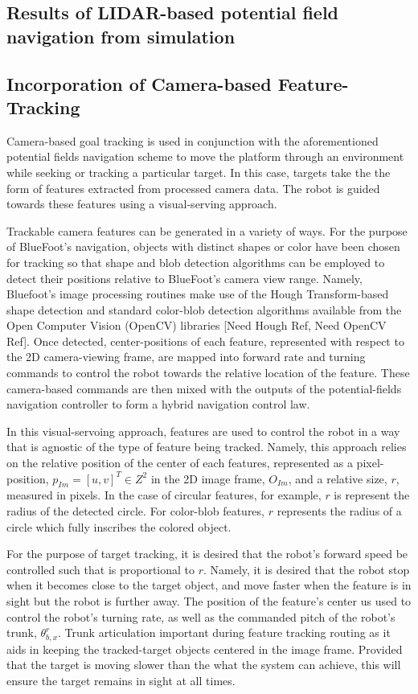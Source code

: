 		\subsection{Results of LIDAR-based potential field navigation from simulation}


		\subsection{Incorporation of Camera-based Feature-Tracking}
		
			Camera-based goal tracking is used in conjunction with the aforementioned potential fields navigation scheme to move the platform through an environment while seeking or tracking a particular target. In this case, targets take the the form of features extracted from processed camera data. The robot is guided towards these features using a visual-serving approach. 

			Trackable camera features can be generated in a variety of ways. For the purpose of BlueFoot's navigation, objects with distinct shapes or color have been chosen for tracking so that shape and blob detection algorithms can be employed to detect their positions relative to BlueFoot's camera view range. Namely, Bluefoot's image processing routines make use of the Hough Transform-based shape detection and standard color-blob detection algorithms available from the Open Computer Vision (OpenCV) libraries [Need Hough Ref, Need OpenCV Ref]. Once detected, center-positions of each feature, represented with respect to the 2D camera-viewing frame, are mapped into forward rate and turning commands to control the robot towards the relative location of the feature. These camera-based commands are then mixed with the outputs of the potential-fields navigation controller to form a hybrid navigation control law.

			In this visual-servoing approach, features are used to control the robot in a way that is agnostic of the type of feature being tracked. Namely, this approach relies on the relative position of the center of each features, represented as a pixel-position, $p_{Im} = [u,v]^{T} \in Z^{2}$ in the 2D image frame, $O_{Im}$, and a relative size, $r$, measured in pixels. In the case of circular features, for example, $r$ is represent the radius of the detected circle. For color-blob features, $r$ represents the radius of a circle which fully inscribes the colored object.

			For the purpose of target tracking, it is desired that the robot's forward speed be controlled such that is proportional to $r$. Namely, it is desired that the robot stop when it becomes close to the target object, and move faster when the feature is in sight but the robot is further away. The position of the feature's center us used to control the robot's turning rate, as well as the commanded pitch of the robot's trunk, $\theta_{b,x}^{r}$. Trunk articulation important during feature tracking routing as it aids in keeping the tracked-target objects centered in the image frame. Provided that the target is moving slower than the what the system can achieve, this will ensure the target remains in sight at all times.

